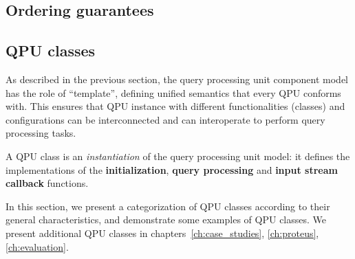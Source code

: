 \subsection{Ordering guarantees}
\todo{}


\subsection{QPU classes}
\label{sec:qpu_classes}

As described in the previous section, the query processing unit component model has the role of ``template'',
defining unified semantics that every QPU conforms with.
This ensures that QPU instance with different functionalities (classes) and configurations can be interconnected and
can interoperate to perform query processing tasks.

A QPU class is an \textit{instantiation} of the query processing unit model:
it defines the implementations of the \textbf{initialization}, \textbf{query processing} and \textbf{input stream callback}
functions.

In this section, we present a categorization of QPU classes according to their general characteristics,
and demonstrate some examples of QPU classes.
We present additional QPU classes in chapters~\ref{ch:case_studies}, \ref{ch:proteus}, \ref{ch:evaluation}.

